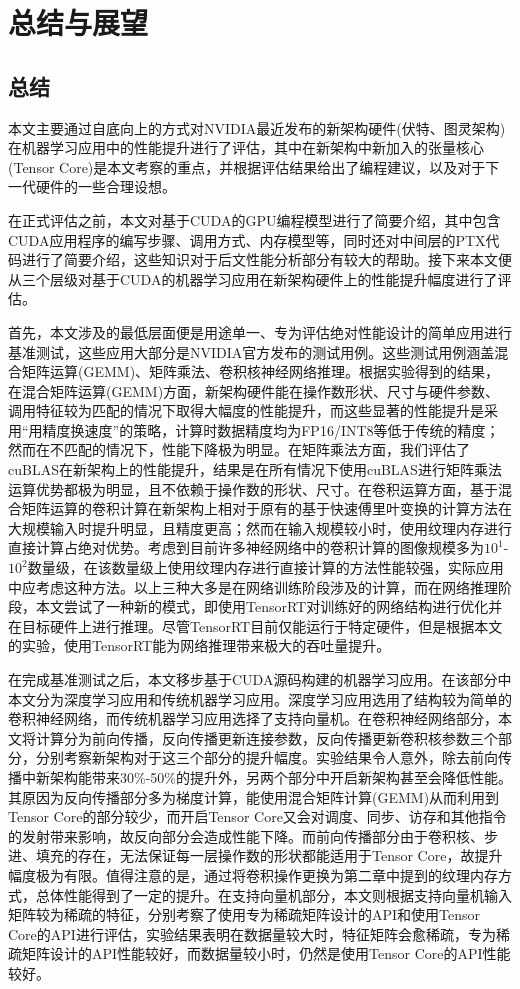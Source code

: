 \newpage
\section{总结与展望}
\setcounter{table}{0}
\setcounter{figure}{0}
\subsection{总结}
\par 本文主要通过自底向上的方式对NVIDIA最近发布的新架构硬件(伏特、图灵架构)在机器学习应用中的性能提升进行了评估，其中在新架构中新加入的张量核心(Tensor Core)是本文考察的重点，并根据评估结果给出了编程建议，以及对于下一代硬件的一些合理设想。
\par 在正式评估之前，本文对基于CUDA的GPU编程模型进行了简要介绍，其中包含CUDA应用程序的编写步骤、调用方式、内存模型等，同时还对中间层的PTX代码进行了简要介绍，这些知识对于后文性能分析部分有较大的帮助。接下来本文便从三个层级对基于CUDA的机器学习应用在新架构硬件上的性能提升幅度进行了评估。
\par 首先，本文涉及的最低层面便是用途单一、专为评估绝对性能设计的简单应用进行基准测试，这些应用大部分是NVIDIA官方发布的测试用例。这些测试用例涵盖混合矩阵运算(GEMM)、矩阵乘法、卷积核神经网络推理。根据实验得到的结果，在混合矩阵运算(GEMM)方面，新架构硬件能在操作数形状、尺寸与硬件参数、调用特征较为匹配的情况下取得大幅度的性能提升，而这些显著的性能提升是采用“用精度换速度”的策略，计算时数据精度均为FP16/INT8等低于传统的精度；然而在不匹配的情况下，性能下降极为明显。在矩阵乘法方面，我们评估了cuBLAS在新架构上的性能提升，结果是在所有情况下使用cuBLAS进行矩阵乘法运算优势都极为明显，且不依赖于操作数的形状、尺寸。在卷积运算方面，基于混合矩阵运算的卷积计算在新架构上相对于原有的基于快速傅里叶变换的计算方法在大规模输入时提升明显，且精度更高；然而在输入规模较小时，使用纹理内存进行直接计算占绝对优势。考虑到目前许多神经网络中的卷积计算的图像规模多为$ 10^1 $-$ 10^2 $数量级，在该数量级上使用纹理内存进行直接计算的方法性能较强，实际应用中应考虑这种方法。以上三种大多是在网络训练阶段涉及的计算，而在网络推理阶段，本文尝试了一种新的模式，即使用TensorRT对训练好的网络结构进行优化并在目标硬件上进行推理。尽管TensorRT目前仅能运行于特定硬件，但是根据本文的实验，使用TensorRT能为网络推理带来极大的吞吐量提升。
\par 在完成基准测试之后，本文移步基于CUDA源码构建的机器学习应用。在该部分中本文分为深度学习应用和传统机器学习应用。深度学习应用选用了结构较为简单的卷积神经网络，而传统机器学习应用选择了支持向量机。在卷积神经网络部分，本文将计算分为前向传播，反向传播更新连接参数，反向传播更新卷积核参数三个部分，分别考察新架构对于这三个部分的提升幅度。实验结果令人意外，除去前向传播中新架构能带来30\%-50\%的提升外，另两个部分中开启新架构甚至会降低性能。其原因为反向传播部分多为梯度计算，能使用混合矩阵计算(GEMM)从而利用到Tensor Core的部分较少，而开启Tensor Core又会对调度、同步、访存和其他指令的发射带来影响，故反向部分会造成性能下降。而前向传播部分由于卷积核、步进、填充的存在，无法保证每一层操作数的形状都能适用于Tensor Core，故提升幅度极为有限。值得注意的是，通过将卷积操作更换为第二章中提到的纹理内存方式，总体性能得到了一定的提升。在支持向量机部分，本文则根据支持向量机输入矩阵较为稀疏的特征，分别考察了使用专为稀疏矩阵设计的API和使用Tensor Core的API进行评估，实验结果表明在数据量较大时，特征矩阵会愈稀疏，专为稀疏矩阵设计的API性能较好，而数据量较小时，仍然是使用Tensor Core的API性能较好。
